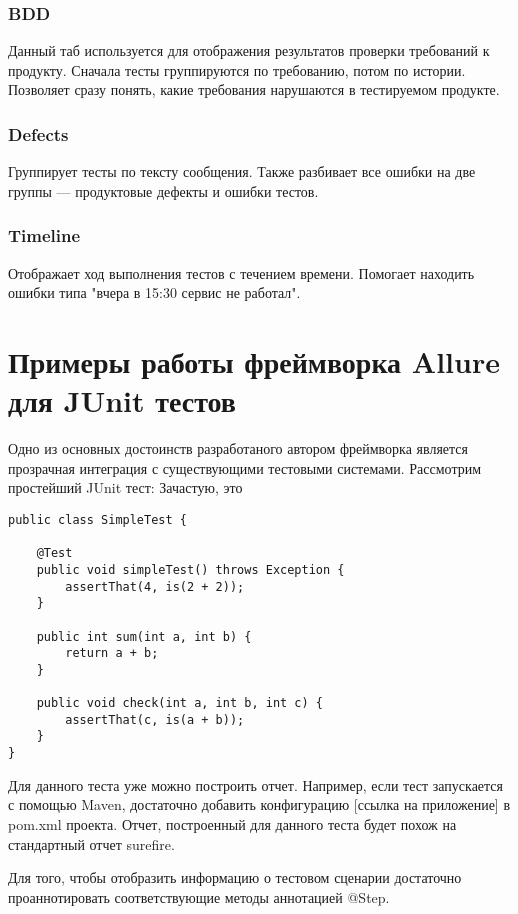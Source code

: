 \subsubsection{BDD}

Данный таб используется для отображения результатов проверки требований к продукту. Сначала тесты группируются по требованию, потом по истории. Позволяет сразу понять, какие требования нарушаются в тестируемом продукте.

\subsubsection{Defects}

Группирует тесты по тексту сообщения. Также разбивает все ошибки на две группы --- продуктовые дефекты и ошибки тестов. 

\subsubsection{Timeline}

Отображает ход выполнения тестов с течением времени. Помогает находить ошибки типа "вчера в 15:30 сервис не работал".

\newpage
\section{Примеры работы фреймворка Allure для JUnit тестов}

Одно из основных достоинств разработаного автором фреймворка является прозрачная интеграция с существующими тестовыми системами. Рассмотрим простейший JUnit тест:
Зачастую, это 

 
\begin{lstlisting}
public class SimpleTest {

    @Test
    public void simpleTest() throws Exception {
        assertThat(4, is(2 + 2));
    }
    
    public int sum(int a, int b) {
		return a + b;
	}    
    
    public void check(int a, int b, int c) {
    	assertThat(c, is(a + b));	
    }
}
\end{lstlisting}

Для данного теста уже можно построить отчет. Например, если тест запускается с помощью Maven, достаточно добавить конфигурацию [ссылка на приложение] в pom.xml проекта. Отчет, построенный для данного теста будет похож на стандартный отчет surefire. 

Для того, чтобы отобразить информацию о тестовом сценарии достаточно проаннотировать соответствующие методы аннотацией @Step.

